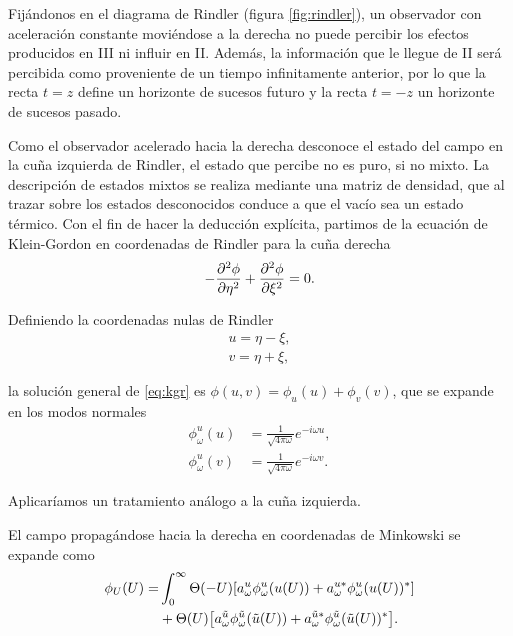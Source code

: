 Fijándonos en el diagrama de Rindler (figura \ref{fig:rindler}),
un observador con aceleración constante moviéndose a la derecha no puede percibir los 
efectos producidos  en III ni influir en II. 
Además, la información que le llegue de II será percibida como proveniente de un tiempo
infinitamente anterior, por lo que la recta $t=z$ define un horizonte de sucesos futuro y 
la recta $t=-z$ un horizonte de sucesos pasado.

Como el observador acelerado hacia la derecha desconoce el estado del campo en la 
cuña izquierda de Rindler, el estado que percibe no es puro, si no mixto.
La descripción de estados mixtos se realiza mediante una matriz de densidad, que al trazar
sobre los estados desconocidos conduce a que el vacío sea un estado térmico.
Con el fin de hacer la deducción explícita, partimos de la ecuación de Klein-Gordon en
coordenadas de Rindler para la cuña derecha
\begin{equation}
  -\pdv[2]{\phi}{\eta}+\pdv[2]{\phi}{\xi} = 0.
  \label{eq:kgr}
\end{equation}

Definiendo la coordenadas nulas de Rindler 
\begin{equation}
  \begin{gathered}
  u=\eta-\xi,\\
  v=\eta+\xi, 
  \end{gathered}
\end{equation}

la solución general de \ref{eq:kgr} es $\phi(u,v)=\phi_u(u)+\phi_v(v)$, que se expande en los
modos normales
\begin{equation}
  \begin{aligned}
    \phi^u_\omega(u) &=\frac{1}{\sqrt{4\pi\omega}}e^{-i\omega u},\\
    \phi^u_\omega(v) &=\frac{1}{\sqrt{4\pi\omega}}e^{-i\omega v}.
  \end{aligned}
\end{equation}

Aplicaríamos un tratamiento análogo a la cuña izquierda.

El campo propagándose hacia la derecha en coordenadas de Minkowski se expande como
\begin{equation}
  \begin{aligned}
    \phi_U(U)=&\int_0^\infty \Theta(-U)\qty[a^u_\omega \phi^u_\omega(u(U))+a_\omega^{u*}\phi_\omega^u(u(U))^*] \\
    &+\Theta(U)\qty[a^{\tilde u}_\omega \phi^{\tilde u}_\omega(\tilde u(U))+a_\omega^{\tilde u*}\phi_\omega^{\tilde u}(\tilde u(U))^*].
  \end{aligned}
\end{equation}

